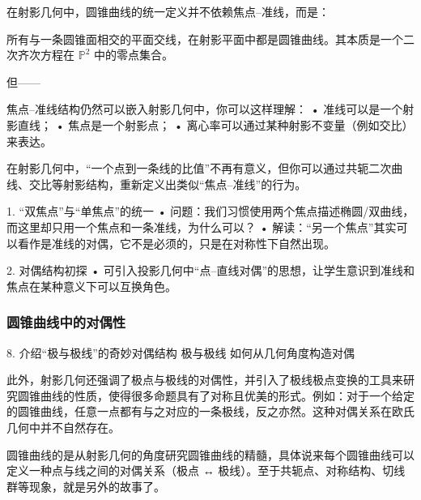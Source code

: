 在射影几何中，圆锥曲线的统一定义并不依赖焦点–准线，而是：

所有与一条圆锥面相交的平面交线，在射影平面中都是圆锥曲线。其本质是一个二次齐次方程在 $\mathbb{P}^2$ 中的零点集合。

但——

焦点–准线结构仍然可以嵌入射影几何中，你可以这样理解：
	•	准线可以是一个射影直线；
	•	焦点是一个射影点；
	•	离心率可以通过某种射影不变量（例如交比）来表达。

在射影几何中，“一个点到一条线的比值”不再有意义，但你可以通过共轭二次曲线、交比等射影结构，重新定义出类似“焦点–准线”的行为。

1. “双焦点”与“单焦点”的统一
	•	问题：我们习惯使用两个焦点描述椭圆/双曲线，而这里却只用一个焦点和一条准线，为什么可以？
	•	解读：“另一个焦点”其实可以看作是准线的对偶，它不是必须的，只是在对称性下自然出现。

2. 对偶结构初探
	•	可引入投影几何中“点–直线对偶”的思想，让学生意识到准线和焦点在某种意义下可以互换角色。

\subsubsection{圆锥曲线中的对偶性}


	8.	介绍“极与极线”的奇妙对偶结构
极与极线	如何从几何角度构造对偶

此外，射影几何还强调了极点与极线的对偶性，并引入了极线极点变换的工具来研究圆锥曲线的性质，使得很多命题具有了对称且优美的形式。例如：对于一个给定的圆锥曲线，任意一点都有与之对应的一条极线，反之亦然。这种对偶关系在欧氏几何中并不自然存在。

圆锥曲线的是从射影几何的角度研究圆锥曲线的精髓，具体说来每个圆锥曲线可以定义一种点与线之间的对偶关系（极点 ↔ 极线）。至于共轭点、对称结构、切线群等现象，就是另外的故事了。


